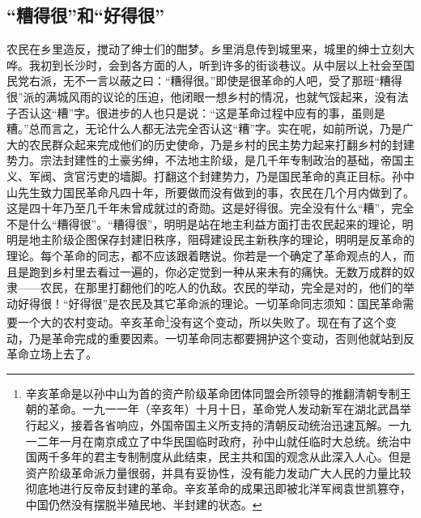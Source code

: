 \documentclass[cn,11pt,chinese]{elegantbook}
\def\myformat#1{\hfil\hfil #1}
\begin{document}
\subsection*{\myformat{“糟得很”和“好得很”}}
农民在乡里造反，搅动了绅士们的酣梦。乡里消息传到城里来，城里的绅士立刻大哗。我初到长沙时，会到各方面的人，听到许多的街谈巷议。从中层以上社会至国民党右派，无不一言以蔽之曰：“糟得很。”即使是很革命的人吧，受了那班“糟得很”派的满城风雨的议论的压迫，他闭眼一想乡村的情况，也就气馁起来，没有法子否认这“糟”字。很进步的人也只是说：“这是革命过程中应有的事，虽则是糟。”总而言之，无论什么人都无法完全否认这“糟”字。实在呢，如前所说，乃是广大的农民群众起来完成他们的历史使命，乃是乡村的民主势力起来打翻乡村的封建势力。宗法封建性的土豪劣绅，不法地主阶级，是几千年专制政治的基础，帝国主义、军阀、贪官污吏的墙脚。打翻这个封建势力，乃是国民革命的真正目标。孙中山先生致力国民革命凡四十年，所要做而没有做到的事，农民在几个月内做到了。这是四十年乃至几千年未曾成就过的奇勋。这是好得很。完全没有什么“糟”，完全不是什么“糟得很”。“糟得很”，明明是站在地主利益方面打击农民起来的理论，明明是地主阶级企图保存封建旧秩序，阻碍建设民主新秩序的理论，明明是反革命的理论。每个革命的同志，都不应该跟着瞎说。你若是一个确定了革命观点的人，而且是跑到乡村里去看过一遍的，你必定觉到一种从来未有的痛快。无数万成群的奴隶——农民，在那里打翻他们的吃人的仇敌。农民的举动，完全是对的，他们的举动好得很！“好得很”是农民及其它革命派的理论。一切革命同志须知：国民革命需要一个大的农村变动。辛亥革命\footnote[3]{ 辛亥革命是以孙中山为首的资产阶级革命团体同盟会所领导的推翻清朝专制王朝的革命。一九一一年（辛亥年）十月十日，革命党人发动新军在湖北武昌举行起义，接着各省响应，外国帝国主义所支持的清朝反动统治迅速瓦解。一九一二年一月在南京成立了中华民国临时政府，孙中山就任临时大总统。统治中国两千多年的君主专制制度从此结束，民主共和国的观念从此深入人心。但是资产阶级革命派力量很弱，并具有妥协性，没有能力发动广大人民的力量比较彻底地进行反帝反封建的革命。辛亥革命的成果迅即被北洋军阀袁世凯篡夺，中国仍然没有摆脱半殖民地、半封建的状态。}没有这个变动，所以失败了。现在有了这个变动，乃是革命完成的重要因素。一切革命同志都要拥护这个变动，否则他就站到反革命立场上去了。\\
\end{document}
